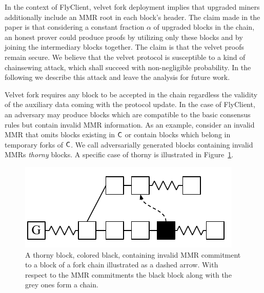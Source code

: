 	In the context of FlyClient, velvet fork deployment implies that upgraded miners additionally include an MMR root in each block's header. 
    The claim made in the paper is that considering a constant fraction $\alpha$ of upgraded blocks in the chain, an honest prover could produce proofs 
    by utilizing only these blocks and by joining the intermediary blocks together. 
    The claim is that the velvet proofs remain secure. We believe that the velvet protocol is susceptible to a kind of chainsewing attack, which shall succeed with non-negligible probability.
    In the following we describe this attack and leave the analysis for future work. 

	Velvet fork requires any block to be accepted in the chain regardless the validity of the auxiliary data coming with the protocol update. 
    In the case of FlyClient, an adversary may produce blocks which are compatible to the basic consensus rules but contain invalid MMR information. 
    As an example, consider an invalid MMR that omits blocks existing in $\mathsf{C}$ or contain blocks which belong in temporary forks of $\mathsf{C}$. 
    We call adversarially generated blocks containing invalid MMRs \emph{thorny} blocks. A specific case of thorny is illustrated in Figure~\ref{fig:thorny_flyclient}.

	\begin{figure}
		\begin{center}
			\includegraphics[width=0.5\columnwidth]{figures/false_interlink.pdf}
		\end{center}
		\caption{A thorny block, colored black, containing invalid MMR commitment to a block of a fork chain illustrated as a dashed arrow. With respect to the MMR commitments the black block along with the grey ones form a chain.}
		\label{fig:thorny_flyclient}
	\end{figure}


